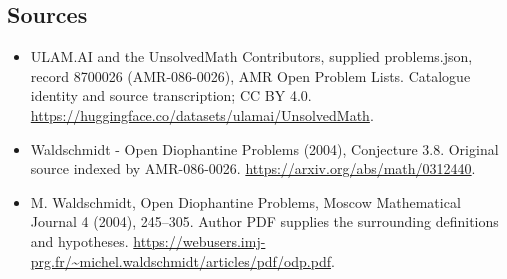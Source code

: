 \documentclass[11pt,a4paper]{article}
\begin{document}
\subsection{Sources}
\begin{itemize}
\item[S1] ULAM.AI and the UnsolvedMath Contributors, supplied problems.json, record 8700026 (AMR-086-0026), AMR Open Problem Lists. Catalogue identity and source transcription; CC BY 4.0.
\url{https://huggingface.co/datasets/ulamai/UnsolvedMath}.
\item[S2] Waldschmidt - Open Diophantine Problems (2004), Conjecture 3.8. Original source indexed by AMR-086-0026.
\url{https://arxiv.org/abs/math/0312440}.
\item[S3] M. Waldschmidt, Open Diophantine Problems, Moscow Mathematical Journal 4 (2004), 245–305. Author PDF supplies the surrounding definitions and hypotheses.
\url{https://webusers.imj-prg.fr/~michel.waldschmidt/articles/pdf/odp.pdf}.
\end{itemize}
\end{document}
